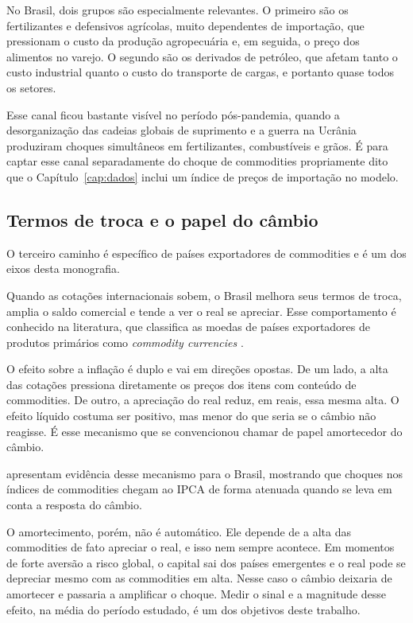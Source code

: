\documentclass[12pt,openright,oneside,a4paper,portuguese,brazil]{abntex2}
\begin{document}
No Brasil, dois grupos são especialmente relevantes. O primeiro são os
fertilizantes e defensivos agrícolas, muito dependentes de importação, que
pressionam o custo da produção agropecuária e, em seguida, o preço dos alimentos
no varejo. O segundo são os derivados de petróleo, que afetam tanto o custo
industrial quanto o custo do transporte de cargas, e portanto quase todos os
setores.

Esse canal ficou bastante visível no período pós-pandemia, quando a
desorganização das cadeias globais de suprimento e a guerra na Ucrânia
produziram choques simultâneos em fertilizantes, combustíveis e grãos. É para
captar esse canal separadamente do choque de commodities propriamente dito que o
Capítulo~\ref{cap:dados} inclui um índice de preços de importação no modelo.

\subsection{Termos de troca e o papel do câmbio}
\label{sec:termostroca}

O terceiro caminho é específico de países exportadores de commodities e é um
dos eixos desta monografia.

Quando as cotações internacionais sobem, o Brasil melhora seus termos de troca,
amplia o saldo comercial e tende a ver o real se apreciar. Esse comportamento é
conhecido na literatura, que classifica as moedas de países exportadores de
produtos primários como \textit{commodity currencies} \cite{chen2003}.

O efeito sobre a inflação é duplo e vai em direções opostas. De um lado, a alta
das cotações pressiona diretamente os preços dos itens com conteúdo de
commodities. De outro, a apreciação do real reduz, em reais, essa mesma alta. O
efeito líquido costuma ser positivo, mas menor do que seria se o câmbio não
reagisse. É esse mecanismo que se convencionou chamar de papel amortecedor do
câmbio.

 apresentam evidência desse mecanismo para o Brasil,
mostrando que choques nos índices de commodities chegam ao IPCA de forma
atenuada quando se leva em conta a resposta do câmbio.

O amortecimento, porém, não é automático. Ele depende de a alta das commodities
de fato apreciar o real, e isso nem sempre acontece. Em momentos de forte
aversão a risco global, o capital sai dos países emergentes e o real pode se
depreciar mesmo com as commodities em alta. Nesse caso o câmbio deixaria de amortecer e passaria a amplificar o choque.
Medir o sinal e a magnitude desse efeito, na média do período estudado, é um
dos objetivos deste trabalho.
\end{document}
